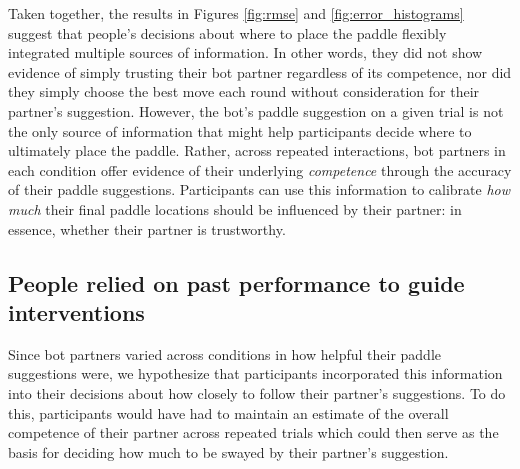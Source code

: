 \documentclass[10pt,letterpaper]{article}
\begin{document}
Taken together, the results in Figures \ref{fig:rmse} and \ref{fig:error_histograms} suggest that people's decisions about where to place the paddle flexibly integrated multiple sources of information. In other words, they did not show evidence of simply trusting their bot partner regardless of its competence, nor did they simply choose the best move each round without consideration for their partner's suggestion. However, the bot's paddle suggestion on a given trial is not the only source of information that might help participants decide where to ultimately place the paddle. Rather, across repeated interactions, bot partners in each condition offer evidence of their underlying \textit{competence} through the accuracy of their paddle suggestions. Participants can use this information to calibrate \textit{how much} their final paddle locations should be influenced by their partner: in essence, whether their partner is trustworthy. 


\subsection{People relied on past performance to guide interventions}

Since bot partners varied across conditions in how helpful their paddle suggestions were, we hypothesize that participants incorporated this information into their decisions about how closely to follow their partner's suggestions. To do this, participants would have had to maintain an estimate of the overall competence of their partner across repeated trials which could then serve as the basis for deciding how much to be swayed by their partner's suggestion. 
\end{document}
